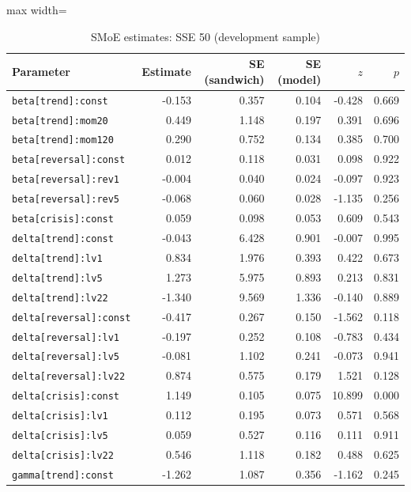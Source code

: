 \begin{table}[!htbp]\centering\scriptsize
\caption{SMoE estimates: SSE 50 (development sample)}\label{tab:params_sse50}
\begin{adjustbox}{max width=\textwidth}
\begin{tabular}{lrrrrr}
\toprule
Parameter & Estimate & SE (sandwich) & SE (model) & $z$ & $p$\\
\midrule
\texttt{beta[trend]:const} & -0.153 & 0.357 & 0.104 & -0.428 & 0.669\\
\texttt{beta[trend]:mom20} & 0.449 & 1.148 & 0.197 & 0.391 & 0.696\\
\texttt{beta[trend]:mom120} & 0.290 & 0.752 & 0.134 & 0.385 & 0.700\\
\texttt{beta[reversal]:const} & 0.012 & 0.118 & 0.031 & 0.098 & 0.922\\
\texttt{beta[reversal]:rev1} & -0.004 & 0.040 & 0.024 & -0.097 & 0.923\\
\texttt{beta[reversal]:rev5} & -0.068 & 0.060 & 0.028 & -1.135 & 0.256\\
\texttt{beta[crisis]:const} & 0.059 & 0.098 & 0.053 & 0.609 & 0.543\\
\texttt{delta[trend]:const} & -0.043 & 6.428 & 0.901 & -0.007 & 0.995\\
\texttt{delta[trend]:lv1} & 0.834 & 1.976 & 0.393 & 0.422 & 0.673\\
\texttt{delta[trend]:lv5} & 1.273 & 5.975 & 0.893 & 0.213 & 0.831\\
\texttt{delta[trend]:lv22} & -1.340 & 9.569 & 1.336 & -0.140 & 0.889\\
\texttt{delta[reversal]:const} & -0.417 & 0.267 & 0.150 & -1.562 & 0.118\\
\texttt{delta[reversal]:lv1} & -0.197 & 0.252 & 0.108 & -0.783 & 0.434\\
\texttt{delta[reversal]:lv5} & -0.081 & 1.102 & 0.241 & -0.073 & 0.941\\
\texttt{delta[reversal]:lv22} & 0.874 & 0.575 & 0.179 & 1.521 & 0.128\\
\texttt{delta[crisis]:const} & 1.149 & 0.105 & 0.075 & 10.899 & 0.000\\
\texttt{delta[crisis]:lv1} & 0.112 & 0.195 & 0.073 & 0.571 & 0.568\\
\texttt{delta[crisis]:lv5} & 0.059 & 0.527 & 0.116 & 0.111 & 0.911\\
\texttt{delta[crisis]:lv22} & 0.546 & 1.118 & 0.182 & 0.488 & 0.625\\
\texttt{gamma[trend]:const} & -1.262 & 1.087 & 0.356 & -1.162 & 0.245\\

\end{tabular}
\end{adjustbox}
\end{table}

